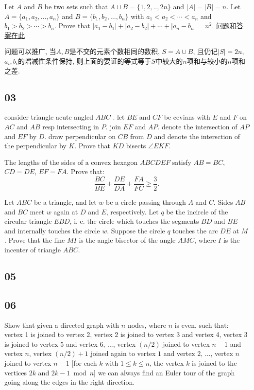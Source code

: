 Let $A$ and $B$ be two sets such that $A \cup B = \{1,2,..,2n\}$ and $|A|=|B|=n$. Let $A = \{a_1,a_2,\ldots,a_n\}$ and $B=\{b_1,b_2,\ldots,b_n\}$ 
with $a_1<a_2<\cdots <a_n$ and $b_1>b_2>\cdots>b_n$. Prove that $|a_1-b_1| + |a_2-b_2| + \cdots + |a_n-b_n|=n^2$.
\eq
\ba
\protect\href{https://artofproblemsolving.com/community/q1h14p22}{问题和答案在此}

问题可以推广, 当$A,B$是不交的元素个数相同的数积, $S=A\cup B$, 且仍记$|S|=2n$, $a_i,b_i$的增减性条件保持, 
则上面的要证的等式等于$S$中较大的$n$项和与较小的$n$项和之差.
\ea

\newpage
\subsection{03}
consider triangle acute angled $ABC$ . let $BE$ and $CF$ be cevians with $E$ and $F$ on
$AC$ and $AB$ resp intersecting in $P$. join $EF$ and $AP$. denote the intersection of $AP$ and $EF$ by $D$. draw perpendicular on $CB$ from $D$ and denote the intersction of the perpendicular by $K$. Prove that $KD$ bisects $\angle EKF$.
\eq

The lengths of the sides of a convex hexagon $ ABCDEF$ satisfy $ AB = BC$, $ CD = DE$, $ EF = FA$. Prove that:
\[ \frac {BC}{BE} + \frac {DE}{DA} + \frac {FA}{FC} \geq \frac {3}{2}. \]
\eq

Let $ABC$ be a triangle, and let $w$ be a circle passing through $A$ and $C$. Sides $AB$ and $BC$ meet $w$ again at $D$ and $E$, respectively. Let $q$ be the incircle of the circular triangle $EBD$, i. e. the circle which touches the segments $BD$ and $BE$ and internally touches the circle $w$. Suppose the circle $q$ touches the arc $DE$ at $M$. Prove that the line $MI$ is the angle bisector of the angle $AMC$, where $I$ is the incenter of triangle $ABC$.
\eq

\newpage
\subsection{05}

\newpage
\subsection{06}
Show that given a directed graph with $n$ nodes, where $n$ is even, such that:
vertex 1 is joined to vertex 2, vertex 2 is joined to vertex 3 and vertex 4, vertex 3 is joined to vertex 5 and vertex 6, ..., vertex $(n/2)$ joined to vertex $n-1$ and vertex $n$, vertex $(n/2) +1$ joined again to vertex $1$ and vertex $2$, ..., vertex $n$ joined to vertex $n-1$
[for each $k$ with $1 \leq k \leq n$, the vertex $k$ is joined to the vertices $2k$ and $2k-1 \bmod n$]
we can always find an Euler tour of the graph going along the edges in the right direction.
\eq

